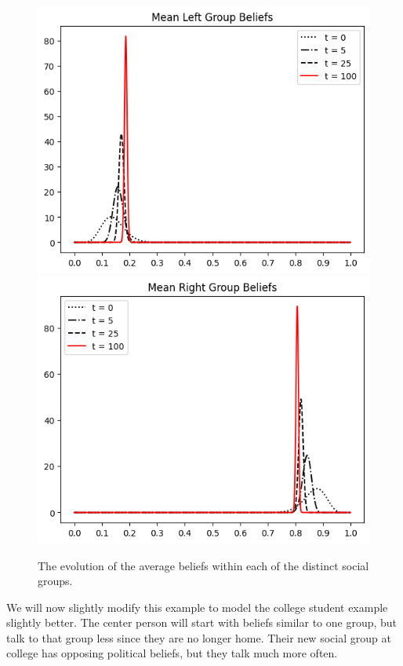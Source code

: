 \documentclass[11pt]{article}
\begin{document}
\begin{figure}[h]
    \centering
    \includegraphics[scale=0.4]{images/two_social_groups_mean_left.png}
    \hspace{1cm}
    \includegraphics[scale=0.4]{images/two_social_groups_mean_right.png}
    \caption{The evolution of the average beliefs within each of the distinct social groups.}
\end{figure}

\newpage

We will now slightly modify this example to model the college student example slightly better. The center person will start with beliefs similar to one group, but talk to that group less since they are no longer home. Their new social group at college has opposing political beliefs, but they talk much more often.
\end{document}
